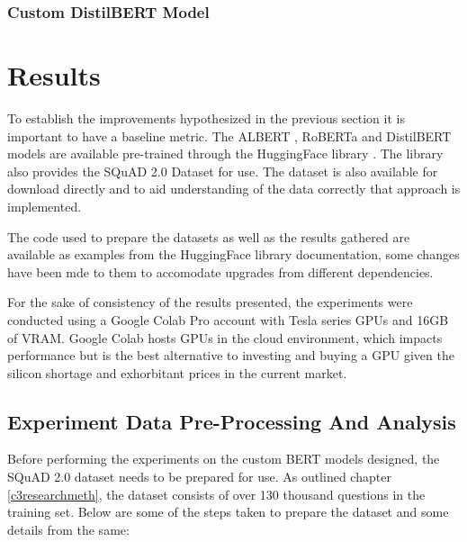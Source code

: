\documentclass[a4paper,12pt]{report}
\begin{document}
            \subsection{Custom DistilBERT Model}
            
            

    \chapter{Results}\label{c5}

        To establish the improvements hypothesized in the previous section it is important to have a baseline metric. The ALBERT \citep{albert}, RoBERTa \citep{roberta} and DistilBERT \citep{distil} models are available pre-trained through the HuggingFace library \citep{hfTransformers}. The library also provides the SQuAD 2.0 Dataset \citep{dataset} for use. The dataset is also available for download directly and to aid understanding of the data correctly that approach is implemented.

        The code used to prepare the datasets as well as the results gathered are available as examples from the HuggingFace library documentation, some changes have been mde to them to accomodate upgrades from different dependencies.

        For the sake of consistency of the results presented, the experiments were conducted using a Google Colab Pro account with Tesla series GPUs and 16GB of VRAM. Google Colab hosts GPUs in the cloud environment, which impacts performance but is the best alternative to investing and buying a GPU given the silicon shortage and exhorbitant prices in the current market.

        \section{Experiment Data Pre-Processing And Analysis}

        Before performing the experiments on the custom BERT models designed, the SQuAD 2.0 dataset needs to be prepared for use. As outlined chapter \ref{c3researchmeth}, the dataset consists of over 130 thousand questions in the training set.
        Below are some of the steps taken to prepare the dataset and some details from the same:
\end{document}
